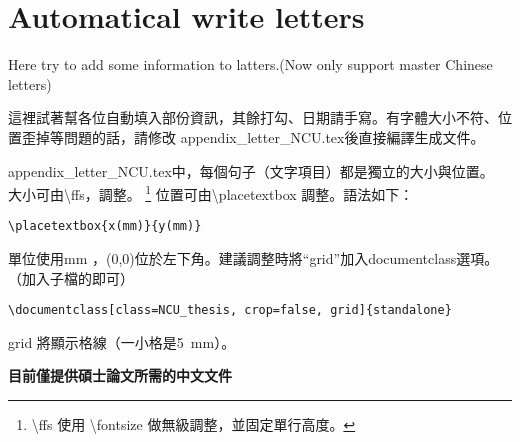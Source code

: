 \documentclass[class=NCU_thesis, crop=false]{standalone}
\begin{document}
\chapter{Automatical write letters}
Here try to add some information to latters.(Now only support master Chinese letters)

這裡試著幫各位自動填入部份資訊，其餘打勾、日期請手寫。有字體大小不符、位置歪掉等問題的話，請修改 appendix\_letter\_NCU.tex後直接編譯生成文件。

appendix\_letter\_NCU.tex中，每個句子（文字項目）都是獨立的大小與位置。 大小可由\textbackslash{}ffs，調整。
\footnote{\textbackslash{}ffs 使用 \textbackslash{}fontsize 做無級調整，並固定單行高度。 }
位置可由\textbackslash{}placetextbox 調整。語法如下：
\begin{lstlisting}[style=LatexStyle,caption={}]
\placetextbox{x(mm)}{y(mm)}
\end{lstlisting}
單位使用mm ，(0,0)位於左下角。建議調整時將``grid''加入documentclass選項。（加入子檔的即可）
\begin{lstlisting}[style=LatexStyle,caption={}]
\documentclass[class=NCU_thesis, crop=false, grid]{standalone}
\end{lstlisting}
grid 將顯示格線（一小格是\SI{5}{\milli\metre}）。

\begin{center}
{ \noindent\color{red}\bfseries\Large 目前僅提供碩士論文所需的中文文件}
\end{center}

\cleardoublepage
\pagestyle{empty}
\sffamily



\end{document}
